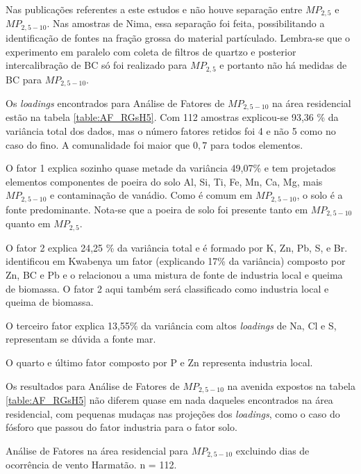 Nas publicações referentes a este estudos \citet{ARKU2008} e 
\citet{DIONISIO2010} não houve separação entre $MP_{2,5}$ e $MP_{2,5-10}$. 
Nas amostras de Nima, essa separação foi feita, possibilitando a identificação
de fontes na fração grossa do material partículado. Lembra-se que o experimento
em paralelo com coleta de filtros de quartzo e posterior intercalibração de BC
só foi realizado para $MP_{2,5}$ e portanto não há medidas de BC para 
$MP_{2,5-10}$.

Os \textit{loadings} encontrados para Análise de Fatores de $MP_{2,5-10}$
na área residencial estão na tabela \ref{table:AF_RGsH5}. Com 112 
amostras explicou-se 93,36 \% da variância total dos dados, mas o número 
fatores retidos foi 4 e não 5 como no caso do fino. A comunalidade foi maior 
que $0,7$ para todos elementos.

O fator 1 explica sozinho quase metade da variância 49,07\% e tem 
projetados elementos componentes de poeira do solo Al, Si, Ti, Fe, Mn, Ca, 
Mg, mais $MP_{2,5-10}$ e contaminação de vanádio. Como é comum em $MP_{2,5-10}$, 
o solo é a fonte predominante. Nota-se que a poeira de solo foi presente 
tanto em $MP_{2,5-10}$ quanto em $MP_{2,5}$.

O fator 2 explica 24,25 \% da variância total e é formado por K, Zn, Pb, S, e 
Br. \citet{aboh2009} identificou em Kwabenya um fator (explicando 17\% da 
variância) composto por Zn, BC e Pb e o relacionou a uma mistura de 
fonte de industria local e queima de biomassa. O fator 2 aqui também será 
classificado como industria local e queima de biomassa. 

O terceiro fator explica 13,55\% da variância com altos \textit{loadings} de 
Na, Cl e S, representam se dúvida a fonte mar. 

O quarto e último fator composto por P e Zn representa industria local. 

Os resultados para Análise de Fatores de $MP_{2,5-10}$ na avenida expostos
na tabela \ref{table:AF_RGsH5} não diferem quase em nada daqueles encontrados
na área residencial, com pequenas mudaças nas projeções dos \textit{loadings}, 
como o caso do fósforo que passou do fator industria para o fator solo. 

\newpage
\begin{table}[H]
  \centering
  
  \caption{Análise de Fatores na área residencial para $MP_{2,5-10}$
           excluindo dias de ocorrência de vento Harmatão. n = 112.
          \label{table:AF_RGsH5}}
\end{table}

